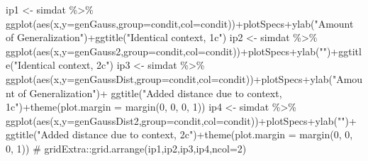 \documentclass[
  letterpaper,
  DIV=11,
  numbers=noendperiod]{scrartcl}
\newenvironment{Shaded}{\begin{snugshade}}{\end{snugshade}}
\newcommand{\AttributeTok}[1]{\textcolor[rgb]{0.40,0.45,0.13}{#1}}
\newcommand{\CommentTok}[1]{\textcolor[rgb]{0.37,0.37,0.37}{#1}}
\newcommand{\DecValTok}[1]{\textcolor[rgb]{0.68,0.00,0.00}{#1}}
\newcommand{\FunctionTok}[1]{\textcolor[rgb]{0.28,0.35,0.67}{#1}}
\newcommand{\NormalTok}[1]{\textcolor[rgb]{0.00,0.23,0.31}{#1}}
\newcommand{\OtherTok}[1]{\textcolor[rgb]{0.00,0.23,0.31}{#1}}
\newcommand{\SpecialCharTok}[1]{\textcolor[rgb]{0.37,0.37,0.37}{#1}}
\newcommand{\StringTok}[1]{\textcolor[rgb]{0.13,0.47,0.30}{#1}}
\begin{document}
\begin{Shaded}
\begin{Highlighting}[]
\NormalTok{ip1 }\OtherTok{\textless{}{-}}\NormalTok{ simdat  }\SpecialCharTok{\%\textgreater{}\%} \FunctionTok{ggplot}\NormalTok{(}\FunctionTok{aes}\NormalTok{(x,}\AttributeTok{y=}\NormalTok{genGauss,}\AttributeTok{group=}\NormalTok{condit,}\AttributeTok{col=}\NormalTok{condit))}\SpecialCharTok{+}\NormalTok{plotSpecs}\SpecialCharTok{+}\FunctionTok{ylab}\NormalTok{(}\StringTok{"Amount of Generalization"}\NormalTok{)}\SpecialCharTok{+}\FunctionTok{ggtitle}\NormalTok{(}\StringTok{"Identical context, 1c"}\NormalTok{)}
\NormalTok{ip2 }\OtherTok{\textless{}{-}}\NormalTok{ simdat }\SpecialCharTok{\%\textgreater{}\%}  \FunctionTok{ggplot}\NormalTok{(}\FunctionTok{aes}\NormalTok{(x,}\AttributeTok{y=}\NormalTok{genGauss2,}\AttributeTok{group=}\NormalTok{condit,}\AttributeTok{col=}\NormalTok{condit))}\SpecialCharTok{+}\NormalTok{plotSpecs}\SpecialCharTok{+}\FunctionTok{ylab}\NormalTok{(}\StringTok{""}\NormalTok{)}\SpecialCharTok{+}\FunctionTok{ggtitle}\NormalTok{(}\StringTok{"Identical context, 2c"}\NormalTok{)}
\NormalTok{ip3 }\OtherTok{\textless{}{-}}\NormalTok{ simdat  }\SpecialCharTok{\%\textgreater{}\%} \FunctionTok{ggplot}\NormalTok{(}\FunctionTok{aes}\NormalTok{(x,}\AttributeTok{y=}\NormalTok{genGaussDist,}\AttributeTok{group=}\NormalTok{condit,}\AttributeTok{col=}\NormalTok{condit))}\SpecialCharTok{+}\NormalTok{plotSpecs}\SpecialCharTok{+}\FunctionTok{ylab}\NormalTok{(}\StringTok{"Amount of Generalization"}\NormalTok{)}\SpecialCharTok{+}
  \FunctionTok{ggtitle}\NormalTok{(}\StringTok{"Added distance due to context, 1c"}\NormalTok{)}\SpecialCharTok{+}\FunctionTok{theme}\NormalTok{(}\AttributeTok{plot.margin =} \FunctionTok{margin}\NormalTok{(}\DecValTok{0}\NormalTok{, }\DecValTok{0}\NormalTok{, }\DecValTok{0}\NormalTok{, }\DecValTok{1}\NormalTok{))}
\NormalTok{ip4 }\OtherTok{\textless{}{-}}\NormalTok{ simdat }\SpecialCharTok{\%\textgreater{}\%}  \FunctionTok{ggplot}\NormalTok{(}\FunctionTok{aes}\NormalTok{(x,}\AttributeTok{y=}\NormalTok{genGaussDist2,}\AttributeTok{group=}\NormalTok{condit,}\AttributeTok{col=}\NormalTok{condit))}\SpecialCharTok{+}\NormalTok{plotSpecs}\SpecialCharTok{+}\FunctionTok{ylab}\NormalTok{(}\StringTok{""}\NormalTok{)}\SpecialCharTok{+}
  \FunctionTok{ggtitle}\NormalTok{(}\StringTok{"Added distance due to context, 2c"}\NormalTok{)}\SpecialCharTok{+}\FunctionTok{theme}\NormalTok{(}\AttributeTok{plot.margin =} \FunctionTok{margin}\NormalTok{(}\DecValTok{0}\NormalTok{, }\DecValTok{0}\NormalTok{, }\DecValTok{0}\NormalTok{, }\DecValTok{1}\NormalTok{))}
\CommentTok{\# gridExtra::grid.arrange(ip1,ip2,ip3,ip4,ncol=2)}


\end{Highlighting}
\end{Shaded}
\end{document}

